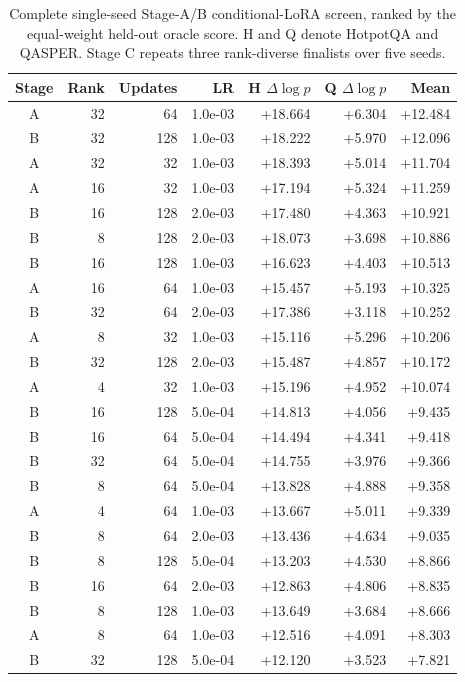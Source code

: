 \begin{table}[H]
\centering
\scriptsize
\caption{Complete single-seed Stage-A/B conditional-LoRA screen, ranked by the equal-weight held-out oracle score. H and Q denote HotpotQA and QASPER. Stage C repeats three rank-diverse finalists over five seeds.}
\label{tab:overnight-lora-grid}
\begin{tabular}{crrrrrr}
\toprule
Stage & Rank & Updates & LR & H $\Delta\log p$ & Q $\Delta\log p$ & Mean \\
\midrule
A & 32 & 64 & 1.0e-03 & +18.664 & +6.304 & +12.484 \\
B & 32 & 128 & 1.0e-03 & +18.222 & +5.970 & +12.096 \\
A & 32 & 32 & 1.0e-03 & +18.393 & +5.014 & +11.704 \\
A & 16 & 32 & 1.0e-03 & +17.194 & +5.324 & +11.259 \\
B & 16 & 128 & 2.0e-03 & +17.480 & +4.363 & +10.921 \\
B & 8 & 128 & 2.0e-03 & +18.073 & +3.698 & +10.886 \\
B & 16 & 128 & 1.0e-03 & +16.623 & +4.403 & +10.513 \\
A & 16 & 64 & 1.0e-03 & +15.457 & +5.193 & +10.325 \\
B & 32 & 64 & 2.0e-03 & +17.386 & +3.118 & +10.252 \\
A & 8 & 32 & 1.0e-03 & +15.116 & +5.296 & +10.206 \\
B & 32 & 128 & 2.0e-03 & +15.487 & +4.857 & +10.172 \\
A & 4 & 32 & 1.0e-03 & +15.196 & +4.952 & +10.074 \\
B & 16 & 128 & 5.0e-04 & +14.813 & +4.056 & +9.435 \\
B & 16 & 64 & 5.0e-04 & +14.494 & +4.341 & +9.418 \\
B & 32 & 64 & 5.0e-04 & +14.755 & +3.976 & +9.366 \\
B & 8 & 64 & 5.0e-04 & +13.828 & +4.888 & +9.358 \\
A & 4 & 64 & 1.0e-03 & +13.667 & +5.011 & +9.339 \\
B & 8 & 64 & 2.0e-03 & +13.436 & +4.634 & +9.035 \\
B & 8 & 128 & 5.0e-04 & +13.203 & +4.530 & +8.866 \\
B & 16 & 64 & 2.0e-03 & +12.863 & +4.806 & +8.835 \\
B & 8 & 128 & 1.0e-03 & +13.649 & +3.684 & +8.666 \\
A & 8 & 64 & 1.0e-03 & +12.516 & +4.091 & +8.303 \\
B & 32 & 128 & 5.0e-04 & +12.120 & +3.523 & +7.821 \\
\bottomrule
\end{tabular}
\end{table}
